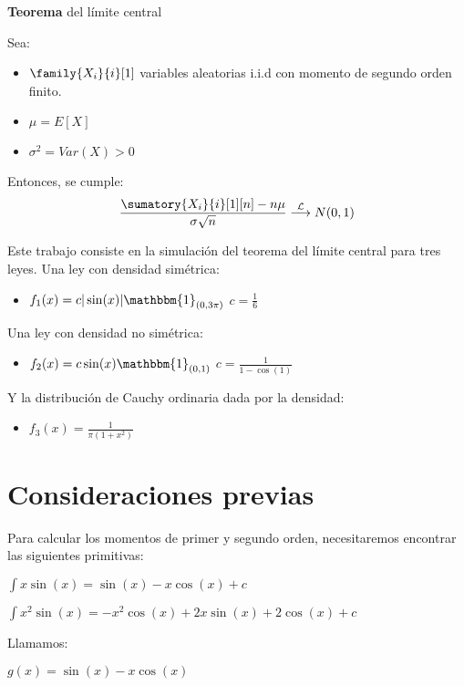 \documentclass[a5paper]{article}
\newcommand{\ind}[1]{\mathbbm{1}_{#1}}
\begin{document}
\renewcommand{\blockname}{ Simulación del teorema central del límite }

\abstract
{
	
	{\bf Teorema} del límite central

	Sea:
	\begin{itemize}
	\item $\family{ X_i }{ i }[ 1 ] $ variables aleatorias i.i.d con momento de segundo orden finito.
	\item $\mu = E[X]$
	\item $\sigma^2 = Var(X) > 0$
	\end{itemize}

	Entonces, se cumple:
	$$\frac{ \sumatory{ X_i }{ i }[ 1 ][ n ] - n\mu }{ \sigma\sqrt{n} } \overset{\mathcal{L}}{\longrightarrow} N(0,1)$$

	Este trabajo consiste en la simulación del teorema del límite central para tres leyes. Una ley con densidad simétrica:
	\begin{itemize}
	\item$ f_1(x) = c|\sin(x)| \ind{(0,3\pi)}$ \hspace{15pt} $ c = \frac{1}{6} $
	\end{itemize}
	Una ley con densidad no simétrica:
	\begin{itemize}
	\item $f_2(x) = c\sin(x) \ind{(0,1)}$ \hspace{15pt} $ c = \frac{1}{1-\cos(1)} $
	\end{itemize}
	Y la distribución de Cauchy ordinaria dada por la densidad:
	\begin{itemize}
	\item $f_3(x) = \frac{ 1 }{ \pi(1+x^2) }$
	\end{itemize}
}

\section{ Consideraciones previas }

Para calcular los momentos de primer y segundo orden, necesitaremos encontrar las siguientes primitivas:

$ \displaystyle\int x\sin(x) = \sin(x) - x\cos(x) + c$

$ \displaystyle\int x^2\sin(x) = -x^2\cos(x) + 2x\sin(x) + 2\cos(x) + c$

Llamamos:

$ g(x) = \sin(x) - x\cos(x) $
\end{document}
